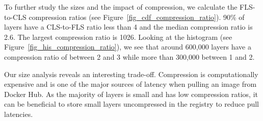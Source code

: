 To further study the sizes and the impact of compression, we calculate
the FLS-to-CLS compression ratios (see Figure~\ref{fig_cdf_compression_ratio}).
%
%
90\% of layers have a  CLS-to-FLS ratio less than 4 and the median
compression ratio is 2.6. The largest compression ratio is 1026.
%
%
%
%
Looking at the histogram (see Figure~\ref{fig_his_compression_ratio}), we see
that around 600,000 layers have a compression ratio of between 2 and 3 while more than
300,000 between 1 and 2.
%

Our size analysis reveals an interesting trade-off. Compression is computationally
expensive and is one of the major sources of latency when pulling an image from Docker Hub.
As the majority of layers is small and has low compression ratios, it can
be beneficial to store small layers uncompressed in the registry to reduce pull latencies.


